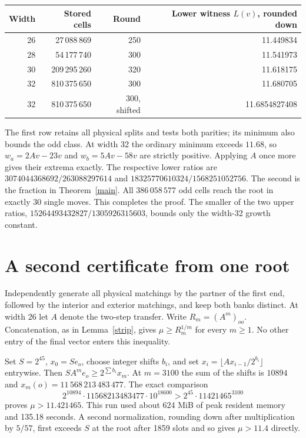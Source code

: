 \documentclass[11pt]{article}
\newcommand{\result}{11.6854827408}
\begin{document}
\begin{center}
\small
\begin{tabular}{rrrr}
\toprule
Width & Stored cells & Round & Lower witness \(L(v)\), rounded down\\
\midrule
26 & 27\,088\,869 & 250 & 11.449834\\
28 & 54\,177\,740 & 300 & 11.541973\\
30 & 209\,295\,260 & 320 & 11.618175\\
32 & 810\,375\,650 & 300 & 11.680705\\
32 & 810\,375\,650 & 300, shifted & \result\\
\bottomrule
\end{tabular}
\end{center}
\noindent The first row retains all physical splits and tests both parities; its minimum also bounds the odd class. At width 32 the ordinary minimum exceeds \(11.68\), so \(w_a=2Av-23v\) and \(w_b=5Av-58v\) are strictly positive. Applying \(A\) once more gives their extrema exactly. The respective lower ratios are \(3074044368692/263088297614\) and \(18325770610324/1568251052756\). The second is the fraction in Theorem~\ref{main}. All \(386\,058\,577\) odd cells reach the root in exactly 30 single moves. This completes the proof. The smaller of the two upper ratios, \(15264493432827/1305926315603\), bounds only the width-32 growth constant.

\newpage
\section{A second certificate from one root}
Independently generate all physical matchings by the partner of the first end, followed by the interior and exterior matchings, and keep both banks distinct. At width 26 let \(A\) denote the two-step transfer. Write \(R_m=(A^m)_{oo}\). Concatenation, as in Lemma~\ref{strip}, gives \(\mu\ge R_m^{1/m}\) for every \(m\ge1\). No other entry of the final vector enters this inequality.

Set \(S=2^{45}\), \(x_0=S e_o\), choose integer shifts \(b_i\), and set \(x_i=\lfloor A x_{i-1}/2^{b_i}\rfloor\) entrywise. Then \(S A^m e_o\ge 2^{\sum b_i} x_m\). At \(m=3100\) the sum of the shifts is \(10894\) and \(x_m(o)=11\,568\,213\,483\,477\). The exact comparison
\[
 2^{10894}\cdot 11568213483477\cdot 10^{18600}
       > 2^{45}\cdot 11421465^{3100}
\]
proves \(\mu>11.421465\). This run used about 624 MiB of peak resident memory and 135.18 seconds. A second normalization, rounding down after multiplication by \(5/57\), first exceeds \(S\) at the root after 1859 slots and so gives \(\mu>11.4\) directly.
\end{document}
